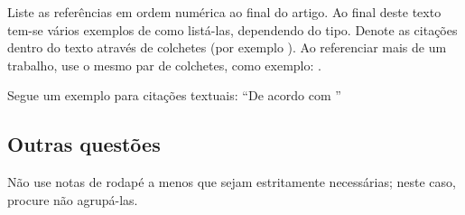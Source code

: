 Liste as referências em ordem numérica ao final do artigo. Ao final deste texto tem-se vários exemplos de como listá-las, dependendo do tipo. Denote as citações dentro do texto através de colchetes (por exemplo \cite{LIMA2018}). Ao referenciar mais de um trabalho, use o mesmo par de colchetes, como exemplo: \cite{LIMA2018, schell2014, Lima2017}. 

Segue um exemplo para citações textuais: ``De acordo com \textcite{LIMA2018}'' 


\subsection{Outras questões}
Não use notas de rodapé a menos que sejam estritamente necessárias; neste caso, procure não agrupá-las. 